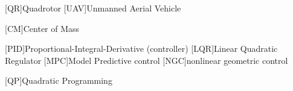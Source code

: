 
\begin{acronym}[\hspace{0.8in}] %
	
		[QR]{Quadrotor}
	[UAV]{Unmanned Aerial Vehicle}
	
	[CM]{Center of Mass}
	
	[PID]{Proportional-Integral-Derivative (controller)}
	[LQR]{Linear Quadratic Regulator}
	[MPC]{Model Predictive control}
	[NGC]{nonlinear geometric control}
	
	[QP]{Quadratic Programming}
	
	
\end{acronym}
	


%	

%
%
%	

%	
%	
%
%	
%
%	
%	
%	

